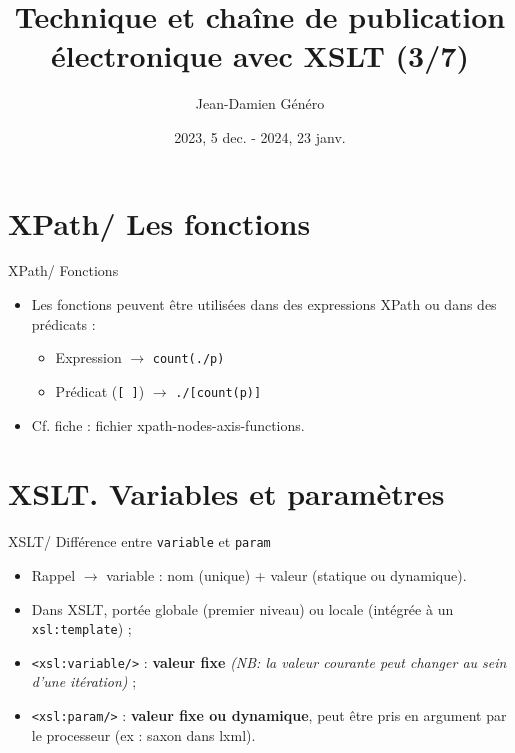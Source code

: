 \documentclass{beamer}
\title{Technique et chaîne de publication électronique avec XSLT (3/7)}
\date{2023, 5 dec. - 2024, 23 janv.}
\author{Jean-Damien Généro}
\institute{École nationale des chartes -- M2 TNAH}
\begin{document}
    \maketitle
    
    \section{XPath/ Les fonctions}

    \begin{frame}{XPath/ Fonctions}
        \Large
        \begin{itemize}
            \item Les fonctions peuvent être utilisées dans des expressions XPath ou dans des prédicats :
            \begin{itemize}
            \Large
                \item Expression $\rightarrow$ \texttt{count(./p)}
                \item Prédicat (\texttt{[ ]}) $\rightarrow$ \texttt{./[count(p)]}
            \end{itemize}
            \bigskip
            \item Cf. fiche : fichier xpath-nodes-axis-functions.
        \end{itemize}
    \end{frame}
    
    \section{XSLT. Variables et paramètres}

    \begin{frame}{XSLT/ Différence entre \texttt{variable} et \texttt{param}}
        \Large
        \begin{itemize}
            \item Rappel $\rightarrow$ variable : nom (unique) + valeur (statique ou dynamique).
            \bigskip
            \item Dans XSLT, portée globale (premier niveau) ou locale (intégrée à un \texttt{xsl:template}) ;
            \bigskip
            \item \texttt{<xsl:variable/>} : \textbf{valeur fixe} \textit{(NB: la valeur courante peut changer au sein d'une itération)} ;
            \bigskip
            \item \texttt{<xsl:param/>} : \textbf{valeur fixe ou dynamique}, peut être pris en argument par le processeur (ex : saxon dans lxml).
        \end{itemize}
    \end{frame}
\end{document}

